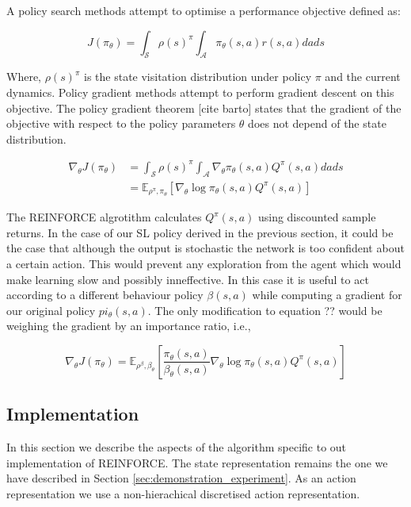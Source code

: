 \documentclass[a4paper,11pt]{report}
\begin{document}
A policy search methods attempt to optimise a performance objective defined as:

\begin{equation}
	J(\pi_{\theta}) = \int_{\mathcal{S}} \rho(s)^{\pi} \int_{\mathcal{A}}\pi_{\theta}(s,a)r(s,a)dads
\end{equation}

Where, $ \rho(s)^{\pi}$ is the state visitation distribution under policy $\pi$ and the current dynamics.
Policy gradient methods attempt to perform gradient descent on this objective. The policy gradient theorem [cite barto] states that the gradient of the objective with respect to the policy parameters $\theta$ does not depend of the state distribution.

\begin{align}
	\nabla_{\theta}J(\pi_{\theta}) &= \int_{\mathcal{S}} \rho(s)^{\pi} \int_{\mathcal{A}}\nabla_{\theta}\pi_{\theta}(s,a)Q^{\pi}(s,a)dads\\
	&= \mathbb{E}_{\rho^{\pi},\pi_{\theta}} [\nabla_{\theta}\log\pi_{\theta}(s,a)Q^{\pi}(s,a)]
\end{align}

The REINFORCE algrotithm calculates $Q^{\pi}(s,a)$ using discounted sample returns.
In the case of our SL policy derived in the previous section, it could be the case that although the output is stochastic the network is too confident about a certain action. This would prevent any exploration from the agent which would make learning slow and possibly inneffective. In this case it is useful to act according to a different behaviour policy $\beta(s,a)$ while computing a gradient for our original policy $pi_{\theta}(s,a)$. The only modification to equation ?? would be weighing the gradient by an importance ratio, i.e.,  

\begin{equation}
\nabla_{\theta}J(\pi_{\theta}) = \mathbb{E}_{\rho^{\beta},\beta_{\theta}} [\frac{\pi_{\theta}(s,a)}{\beta_{\theta}(s,a)}\nabla_{\theta}\log\pi_{\theta}(s,a)Q^{\pi}(s,a)]
\end{equation}




\subsection{Implementation}
In this section we describe the aspects of the algorithm specific to out implementation of REINFORCE. The state representation remains the one we have described in Section \ref{sec:demonstration_experiment}. As an action representation we use a non-hierachical discretised action representation.
\end{document}
